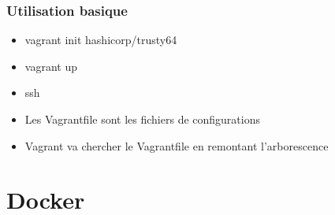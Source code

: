 \documentclass{beamer}
\begin{document}
    \subsubsection{Utilisation basique}
    \begin{frame}
        \begin{itemize}
            \item{vagrant init hashicorp/trusty64}
            \item{vagrant up}
            \item{ssh}
        \end{itemize}

        \begin{itemize}
            \item{Les Vagrantfile sont les fichiers de configurations}
            \item{Vagrant va chercher le Vagrantfile en remontant l'arborescence}
        \end{itemize}
    \end{frame}
    
    
    \section{Docker}
\end{document}
